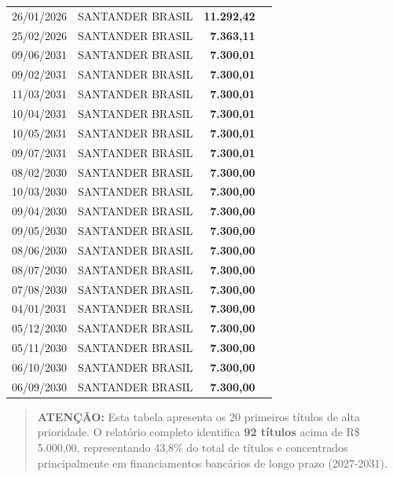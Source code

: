 \documentclass[12pt, a4paper]{article}
\begin{document}
\begin{longtable}{c p{5.5cm} r p{3cm}}
    26/01/2026 & SANTANDER BRASIL & \textcolor{accentColor}{\textbf{11.292,42}} &  \\
    25/02/2026 & SANTANDER BRASIL & \textcolor{accentColor}{\textbf{7.363,11}} &  \\
    09/06/2031 & SANTANDER BRASIL & \textcolor{accentColor}{\textbf{7.300,01}} &  \\
    09/02/2031 & SANTANDER BRASIL & \textcolor{accentColor}{\textbf{7.300,01}} &  \\
    11/03/2031 & SANTANDER BRASIL & \textcolor{accentColor}{\textbf{7.300,01}} &  \\
    10/04/2031 & SANTANDER BRASIL & \textcolor{accentColor}{\textbf{7.300,01}} &  \\
    10/05/2031 & SANTANDER BRASIL & \textcolor{accentColor}{\textbf{7.300,01}} &  \\
    09/07/2031 & SANTANDER BRASIL & \textcolor{accentColor}{\textbf{7.300,01}} &  \\
    08/02/2030 & SANTANDER BRASIL & \textcolor{accentColor}{\textbf{7.300,00}} &  \\
    10/03/2030 & SANTANDER BRASIL & \textcolor{accentColor}{\textbf{7.300,00}} &  \\
    09/04/2030 & SANTANDER BRASIL & \textcolor{accentColor}{\textbf{7.300,00}} &  \\
    09/05/2030 & SANTANDER BRASIL & \textcolor{accentColor}{\textbf{7.300,00}} &  \\
    08/06/2030 & SANTANDER BRASIL & \textcolor{accentColor}{\textbf{7.300,00}} &  \\
    08/07/2030 & SANTANDER BRASIL & \textcolor{accentColor}{\textbf{7.300,00}} &  \\
    07/08/2030 & SANTANDER BRASIL & \textcolor{accentColor}{\textbf{7.300,00}} &  \\
    04/01/2031 & SANTANDER BRASIL & \textcolor{accentColor}{\textbf{7.300,00}} &  \\
    05/12/2030 & SANTANDER BRASIL & \textcolor{accentColor}{\textbf{7.300,00}} &  \\
    05/11/2030 & SANTANDER BRASIL & \textcolor{accentColor}{\textbf{7.300,00}} &  \\
    06/10/2030 & SANTANDER BRASIL & \textcolor{accentColor}{\textbf{7.300,00}} &  \\
    06/09/2030 & SANTANDER BRASIL & \textcolor{accentColor}{\textbf{7.300,00}} &  \\
\end{longtable}

\vspace{-0.3cm}
\begin{quote}
    \footnotesize \textbf{ATENÇÃO:} Esta tabela apresenta os 20 primeiros títulos de alta prioridade. O relatório completo identifica \textbf{92 títulos} acima de R\$ 5.000,00, representando 43,8\% do total de títulos e concentrados principalmente em financiamentos bancários de longo prazo (2027-2031).
\end{quote}
\end{document}
